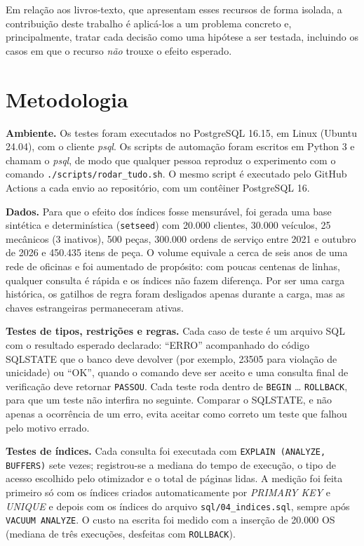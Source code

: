\documentclass[a4paper,12pt]{article}
\newcommand{\cod}[1]{\texttt{\small #1}}
\begin{document}
Em relação aos livros-texto, que apresentam esses recursos de forma
isolada, a contribuição deste trabalho é aplicá-los a um problema
concreto e, principalmente, tratar cada decisão como uma hipótese a ser
testada, incluindo os casos em que o recurso \emph{não} trouxe o efeito
esperado.

\section{Metodologia}

\textbf{Ambiente.} Os testes foram executados no PostgreSQL 16.15, em
Linux (Ubuntu 24.04), com o cliente \emph{psql}. Os scripts de
automação foram escritos em Python 3 e chamam o \emph{psql}, de modo
que qualquer pessoa reproduz o experimento com o comando
\cod{./scripts/rodar\_tudo.sh}. O mesmo script é executado pelo GitHub
Actions a cada envio ao repositório, com um contêiner PostgreSQL 16.

\textbf{Dados.} Para que o efeito dos índices fosse mensurável, foi
gerada uma base sintética e determinística (\cod{setseed}) com 20.000
clientes, 30.000 veículos, 25 mecânicos (3 inativos), 500 peças,
300.000 ordens de serviço entre 2021 e outubro de 2026 e 450.435 itens
de peça. O volume equivale a cerca de seis anos de uma rede de oficinas
e foi aumentado de propósito: com poucas centenas de linhas, qualquer
consulta é rápida e os índices não fazem diferença. Por ser uma carga
histórica, os gatilhos de regra foram desligados apenas durante a
carga, mas as chaves estrangeiras permaneceram ativas.

\textbf{Testes de tipos, restrições e regras.} Cada caso de teste é um
arquivo SQL com o resultado esperado declarado: ``ERRO'' acompanhado do
código SQLSTATE que o banco deve devolver (por exemplo, 23505 para
violação de unicidade) ou ``OK'', quando o comando deve ser aceito e uma
consulta final de verificação deve retornar \cod{PASSOU}. Cada teste
roda dentro de \cod{BEGIN} \dots{} \cod{ROLLBACK}, para que um teste não
interfira no seguinte. Comparar o SQLSTATE, e não apenas a ocorrência de
um erro, evita aceitar como correto um teste que falhou pelo motivo
errado.

\textbf{Testes de índices.} Cada consulta foi executada com
\cod{EXPLAIN (ANALYZE, BUFFERS)} sete vezes; registrou-se a mediana do
tempo de execução, o tipo de acesso escolhido pelo otimizador e o total
de páginas lidas. A medição foi feita primeiro só com os índices
criados automaticamente por \emph{PRIMARY KEY} e \emph{UNIQUE} e depois
com os índices do arquivo \cod{sql/04\_indices.sql}, sempre após
\cod{VACUUM ANALYZE}. O custo na escrita foi medido com a inserção de
20.000 OS (mediana de três execuções, desfeitas com \cod{ROLLBACK}).
\end{document}

